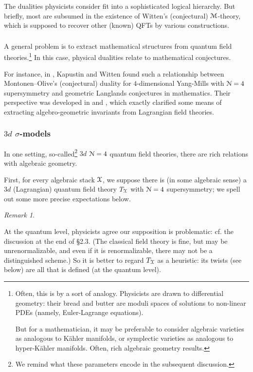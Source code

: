 \documentclass[reqno,11pt]{amsart}
\numberwithin{equation}{subsection}
\theoremstyle{remark}
\newtheorem{rem}[thm]{Remark}
\newcommand{\sM}{{\EuScript M}}
\newcommand{\sN}{{\EuScript N}}
\newcommand{\sX}{{\EuScript X}}
\begin{document}
The dualities physicists consider fit into a sophisticated logical hierarchy.
But briefly, most are subsumed in the existence of Witten's (conjectural) $\sM$-theory,
which is supposed to recover other (known) QFTs by various constructions.

\subsubsection{}

A general problem is to extract mathematical structures
from quantum field theories.\footnote{Often, this is by a sort of analogy. Physicists
are drawn to differential geometry: their bread and butter are moduli spaces
of solutions to non-linear PDEs (namely, Euler-Lagrange equations).

But for a mathematician,
it may be preferable to consider algebraic varieties as analogous to K\"ahler
manifolds, or symplectic varieties as analogous to hyper-K\"ahler manifolds. 
Often, rich algebraic geometry results.} 
In this case, physical dualities relate to mathematical
conjectures.

For instance, in \cite{kapustin-witten}, 
Kapustin and Witten found such a relationship 
between Montonen--Olive's (conjectural) duality for 
$4$-dimensional Yang-Mills with $\sN = 4$ supersymmetry and geometric Langlands
conjectures in mathematics. Their perspective was developed in 
\cite{costello-ss-2-4} and 
\cite{elliott-yoo}, which exactly clarified some means of extracting
algebro-geometric invariants from Lagrangian field theories.

\subsubsection{$3d$ $\sigma$-models}

In one setting, so-called\footnote{We remind what these parameters
encode in the subsequent discussion.}
$3d$ $\sN = 4$ quantum field theories, there are 
rich relations with algebraic geometry.

First, for every algebraic stack $\sX$, we suppose
there is (in some algebraic sense) 
a $3d$ (Lagrangian) quantum field theory
$T_{\sX}$ with $\sN = 4$ supersymmetry; 
we spell out some more precise expectations below. 

\begin{rem}\label{r:no-qft}

At the quantum level, physicists agree our supposition is problematic: 
cf. the discussion at the
end of \cite{rozansky-witten} \S 2.3. (The 
classical field theory is fine, but may be unrenormalizable, and even if it is
renormalizable, there may not be a distinguished scheme.)
So it is better 
to regard $T_{\sX}$ as a heuristic:
its twists (see below) are all that is defined
(at the quantum level). 

\end{rem}
\end{document}
